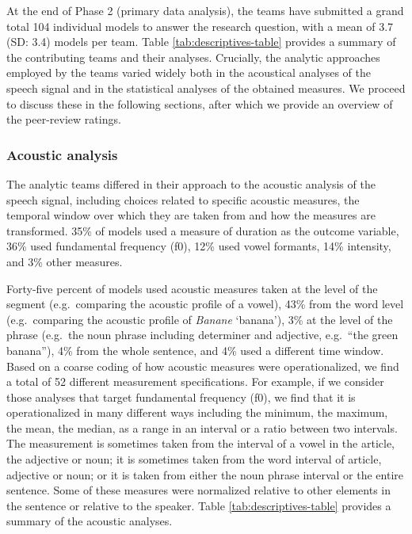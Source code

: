 \documentclass[Review,times,sageh]{sagej}
\begin{document}
At the end of Phase 2 (primary data analysis), the teams have submitted a grand total 104 individual models to answer the research question, with a mean of 3.7 (SD: 3.4) models per team.
Table \ref{tab:descriptives-table} provides a summary of the contributing teams and their analyses.
Crucially, the analytic approaches employed by the teams varied widely both in the acoustical analyses of the speech signal and in the statistical analyses of the obtained measures.
We proceed to discuss these in the following sections, after which we provide an overview of the peer-review ratings.

\vspace{0.2in}

\hypertarget{acoustic-analysis}{%
\subsubsection{Acoustic analysis}\label{acoustic-analysis}}

The analytic teams differed in their approach to the acoustic analysis of the speech signal, including choices related to specific acoustic measures, the temporal window over which they are taken from and how the measures are transformed.
35\% of models used a measure of duration as the outcome variable, 36\% used fundamental frequency (f0), 12\% used vowel formants, 14\% intensity, and 3\% other measures.

Forty-five percent of models used acoustic measures taken at the level of the segment (e.g.~comparing the acoustic profile of a vowel), 43\% from the word level (e.g.~comparing the acoustic profile of \emph{Banane} `banana'), 3\% at the level of the phrase (e.g.~the noun phrase including determiner and adjective, e.g.~``the green banana''), 4\% from the whole sentence, and 4\% used a different time window.
Based on a coarse coding of how acoustic measures were operationalized, we find a total of 52 different measurement specifications.
For example, if we consider those analyses that target fundamental frequency (f0), we find that it is operationalized in many different ways including the minimum, the maximum, the mean, the median, as a range in an interval or a ratio between two intervals.
The measurement is sometimes taken from the interval of a vowel in the article, the adjective or noun; it is sometimes taken from the word interval of article, adjective or noun; or it is taken from either the noun phrase interval or the entire sentence.
Some of these measures were normalized relative to other elements in the sentence or relative to the speaker.
Table \ref{tab:descriptives-table} provides a summary of the acoustic analyses.
\end{document}
